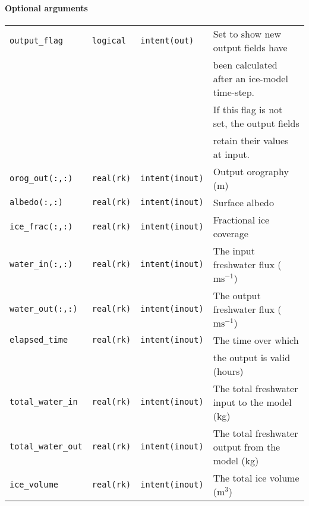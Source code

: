 \paragraph{Optional arguments}
%
\begin{center}
\begin{tabular}{llll}
\texttt{output\_flag} & \texttt{logical} & \texttt{intent(out)} & Set to show
new output fields have \\
 & & & been calculated after an ice-model time-step. \\
 & & & If this flag is not set, the output fields \\
 & & & retain their values at input. \\
\texttt{orog\_out(:,:)} & \texttt{real(rk)} & \texttt{intent(inout)} & Output
orography (m)\\ 
\texttt{albedo(:,:)} & \texttt{real(rk)} & \texttt{intent(inout)} & Surface
albedo \\
\texttt{ice\_frac(:,:)} & \texttt{real(rk)} & \texttt{intent(inout)} &
Fractional ice coverage \\
\texttt{water\_in(:,:)} & \texttt{real(rk)} & \texttt{intent(inout)} & The
input freshwater flux ($\mathrm{ms}^{-1}$) \\
\texttt{water\_out(:,:)} & \texttt{real(rk)} & \texttt{intent(inout)} & The
output freshwater flux ($\mathrm{ms}^{-1}$) \\
\texttt{elapsed\_time} & \texttt{real(rk)} & \texttt{intent(inout)} & The time
over which \\
 & & & the output is valid (hours) \\
\texttt{total\_water\_in} & \texttt{real(rk)} & \texttt{intent(inout)} & The
total freshwater input to the model (kg) \\
\texttt{total\_water\_out} & \texttt{real(rk)} & \texttt{intent(inout)} & The
total freshwater output from the model (kg) \\
\texttt{ice\_volume} & \texttt{real(rk)} & \texttt{intent(inout)} & The total
ice volume (m$^3$) \\
\end{tabular}
\end{center}
